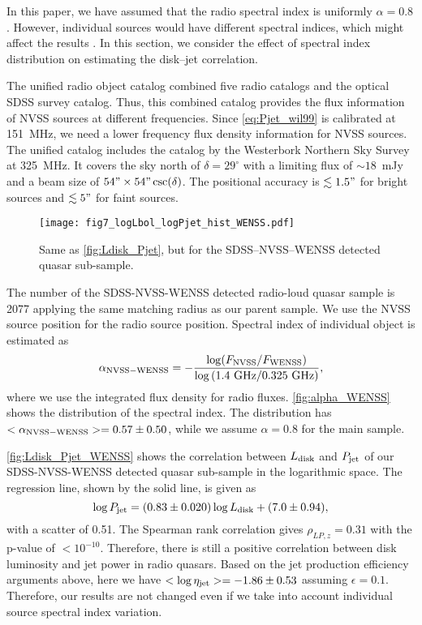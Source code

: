 \documentclass[preprint2,twocolappendix]{aastex6}
\begin{document}
In this paper, we have assumed that the radio spectral index is uniformly $\alpha=0.8$. However, individual sources would have different spectral indices, which might affect the results \citep[e.g.,][for the radio luminosity function]{yua16}. In this section, we consider the effect of spectral index distribution on estimating the disk--jet correlation. 

The unified radio object catalog \citep{kim08,kim14} combined five radio catalogs and the optical SDSS survey catalog. Thus, this combined catalog provides the flux information of NVSS sources at different frequencies. Since \autoref{eq:Pjet_wil99} is calibrated at 151~MHz, we need a lower frequency flux density information for NVSS sources. The unified catalog includes the catalog by the Westerbork Northern Sky Survey \citep[WENSS;][]{ren97} at 325~MHz. It covers the sky north of $\delta=29^\circ$ with a limiting flux of $\sim18$~mJy and a beam size of $54"\times54"\csc(\delta)$. The positional accuracy is $\lesssim1.5"$ for bright sources and $\lesssim5"$ for faint sources.

\begin{figure}[t]
 \begin{center}
  \texttt{[image: fig7\_logLbol\_logPjet\_hist\_WENSS.pdf]} 
 \end{center}
\caption{Same as \autoref{fig:Ldisk_Pjet}, but for the SDSS--NVSS--WENSS detected quasar sub-sample.}\label{fig:Ldisk_Pjet_WENSS}
\end{figure}

The number of the SDSS-NVSS-WENSS detected radio-loud quasar sample is 2077 applying the same matching radius as our parent sample. We use the NVSS source position for the radio source position. Spectral index of individual object is estimated as
\begin{equation}
\alpha_{\rm NVSS-WENSS} = - \frac{\log(F_{\rm NVSS}/F_{\rm WENSS})}{\log{\rm (1.4~GHz/0.325~GHz)}},
\end{equation}
where we use the integrated flux density for radio fluxes. \autoref{fig:alpha_WENSS} shows the distribution of the spectral index. The distribution has $<\alpha_{\rm NVSS-WENSS}>=0.57\pm 0.50$, while we assume $\alpha=0.8$ for the main sample.

\autoref{fig:Ldisk_Pjet_WENSS} shows the correlation between $L_{\rm disk}$ and $P_{\rm jet}$ of our SDSS-NVSS-WENSS detected quasar sub-sample in the logarithmic space. The regression line, shown by the solid line, is given as
\begin{equation}
\log P_{\rm jet} = (0.83 \pm 0.020) \log L_{\rm disk} + (7.0 \pm 0.94),
\end{equation}
with a scatter of 0.51. The Spearman rank correlation gives $\rho_{LP,z}=0.31$ with the p-value of $<10^{-10}$. Therefore, there is still a positive correlation between disk luminosity and jet power in radio quasars. Based on the jet production efficiency arguments above, here we have $<\log \eta_{\rm jet}>=-1.86\pm0.53$ assuming $\epsilon=0.1$. Therefore, our results are not changed even if we take into account individual source spectral index variation.
\end{document}
